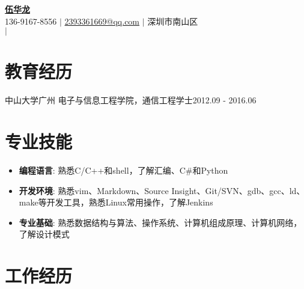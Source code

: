 



\begin{center}
  \small \textbf{\href{http://www.cnblogs.com/wuhualong/}{\huge 伍华龙}} \\  
  136-9167-8556 $\vert$
  \href{mailto:2393361669@qq.com}{2393361669@qq.com} $\vert$
  深圳市南山区 \\
  \href{https://github.com/whl1729}{\color{blue}{github.com/whl1729}} $\vert$
  \href{http://www.cnblogs.com/wuhualong/}{\color{blue}{cnblogs.com/wuhualong/}} \\
\end{center}

\section{教育经历}
  \resumeSubHeadingListStart
    \resumeSubheading
      {中山大学}{广州}
      {电子与信息工程学院，通信工程学士}{2012.09 - 2016.06}
  \resumeSubHeadingListEnd

\section{专业技能}
  \begin{itemize}[leftmargin=*]
    \item \textbf{编程语言}: 熟悉C/C++和shell，了解汇编、C\#和Python
    \item \textbf{开发环境}: 熟悉vim、Markdown、Source Insight、Git/SVN、gdb、gcc、ld、make等开发工具，熟悉Linux常用操作，了解Jenkins
    \item \textbf{专业基础}: 熟悉数据结构与算法、操作系统、计算机组成原理、计算机网络，了解设计模式
  \end{itemize}

\section{工作经历}
  \resumeSubHeadingListStart

